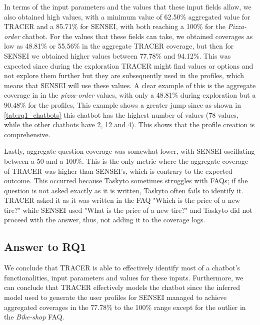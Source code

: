 In terms of the input parameters and
the values that these input fields allow,
we also obtained high values,
with a minimum value of 62.50\% aggregated value for TRACER
and a 85.71\% for SENSEI,
with both reaching a 100\% for the \textit{Pizza-order} chatbot.
For the values that these fields can take, we obtained
coverages as low as 48.81\% or 55.56\% in the aggregate \ac{TRACER} coverage,
but then for SENSEI we obtained higher values between 77.78\% and 94.12\%.
This was expected since during the exploration
TRACER might find values or options and not explore them further
but they are subsequently used in the profiles,
which means that SENSEI will use these values.
A clear example of this is the aggregate coverage in in the \textit{pizza-order} values,
with only a 48.81\% during exploration but a 90.48\% for the profiles,
This example shows a greater jump since as shown in \autoref{tab:rq1_chatbots}
this chatbot has the highest number of values
(78 values, while the other chatbots have 2, 12 and 4).
This shows that the profile creation is comprehensive.

Lastly, aggregate question coverage was somewhat lower,
with SENSEI oscillating between a 50 and a 100\%.
This is the only metric where the aggregate coverage of TRACER
was higher than SENSEI's, which is contrary to the expected outcome.
This occurred because Taskyto sometimes struggles with FAQs;
if the question is not asked exactly as it is written,
Taskyto often fails to identify it.
\ac{TRACER} asked it as it was written in the FAQ
"Which is the price of a new tire?"
while SENSEI used "What is the price of a new tire?"
and Taskyto did not proceed with the answer, thus,
not adding it to the coverage logs.

\subsection{Answer to RQ1}

We conclude that \ac{TRACER} is able to effectively identify
most of a chatbot's functionalities, input parameters and values for these inputs.
Furthermore, we can conclude that TRACER effectively models the chatbot
since the inferred model used to generate the user profiles for SENSEI
managed to achieve aggregated coverages in the 77.78\% to the 100\% range
except for the outlier in the \textit{Bike-shop} FAQ.
